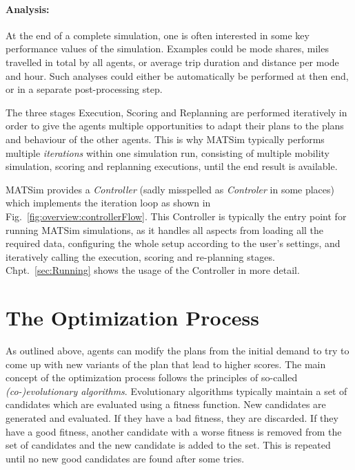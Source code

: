 \paragraph{Analysis:}
At the end of a complete simulation, one is often interested in some key
performance values of the simulation. Examples could be mode shares, miles
travelled in total by all agents, or average trip duration and distance per
mode and hour. Such analyses could either be automatically be performed at then
end, or in a separate post-processing step.

\bigskip

The three stages Execution, Scoring and Replanning are performed iteratively in
order to give the agents multiple opportunities to adapt their plans to the
plans and behaviour of the other agents. This is why MATSim typically performs
multiple \emph{iterations} within one simulation run, consisting of multiple
mobility simulation, scoring and replanning executions, until the end result is
available.

MATSim provides a \emph{Controller} (sadly misspelled as \emph{Controler} in
some places) which implements the iteration loop as shown in
Fig.~\ref{fig:overview:controllerFlow}. This Controller is typically the entry
point for running MATSim simulations, as it handles all aspects from loading all
the required data, configuring the whole setup according to the user's settings,
and iteratively calling the execution, scoring and re-planning stages.
Chpt.~\ref{sec:Running} shows the usage of the Controller in more
detail.


\section{The Optimization Process}
\label{sec:Overview:Optimization}

As outlined above, agents can modify the plans from the initial demand to try to
come up with new variants of the plan that lead to higher scores. The main
concept of the optimization process follows the principles of so-called
\emph{(co-)evolutionary algorithms}. Evolutionary algorithms typically maintain
a set of candidates which are evaluated using a fitness function. New candidates are
generated and evaluated. If they have a bad fitness, they are discarded. If they
have a good fitness, another candidate with a worse fitness is removed from the
set of candidates and the new candidate is added to the set. This is repeated
until no new good candidates are found after some tries.

